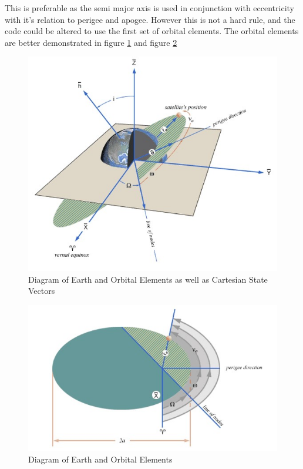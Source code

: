 \documentclass[12pt]{article}
\begin{document}
	This is preferable as the semi major axis is used in conjunction with eccentricity with it's relation to perigee and apogee.  However this is not a hard rule, and the code could be altered to use the first set of orbital elements. The orbital elements are better demonstrated in figure \ref{fig:nasaoe1} and figure \ref{fig:nasaoe2}
	
	\begin{figure}
		\centering
		\includegraphics[width=0.7\linewidth]{nasaOE1}
		\caption{Diagram of Earth and Orbital Elements as well as Cartesian State Vectors\cite{nasaOE}}
		\label{fig:nasaoe1}
	\end{figure}
	\begin{figure}
		\centering
		\includegraphics[width=0.7\linewidth]{nasaOE2}
		\caption{Diagram of Earth and Orbital Elements\cite{nasaOE}}
		\label{fig:nasaoe2}
	\end{figure}
	
	
\end{document}
